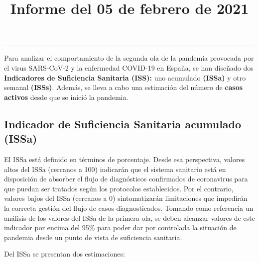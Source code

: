 \documentclass[
  11pt,
]{article}
\title{Informe del 05 de febrero de 2021}
\author{}
\date{\vspace{-2.5em}}
\begin{document}
\maketitle

\renewcommand{\figurename}{Figura}
\renewcommand{\tablename}{Tabla}

\tableofcontents

\vspace{.5cm}

\begin{center}\rule{0.5\linewidth}{0.5pt}\end{center}

\vspace{.5cm}

Para analizar el comportamiento de la segunda ola de la pandemia
provocada por el virus SARS-CoV-2 y la enfermedad COVID-19 en España, se
han diseñado dos \textbf{Indicadores de Suficiencia Sanitaria (ISS):}
uno acumulado \textbf{(ISSa)} y otro semanal \textbf{(ISSs)}. Además, se
lleva a cabo una estimación del número de \textbf{casos activos} desde
que se inició la pandemia.

\hypertarget{indicador-de-suficiencia-sanitaria-acumulado-issa}{%
\subsection{Indicador de Suficiencia Sanitaria acumulado
(ISSa)}\label{indicador-de-suficiencia-sanitaria-acumulado-issa}}

El ISSa está definido en términos de porcentaje. Desde esa perspectiva,
valores altos del ISSa (cercanos a 100) indicarán que el sistema
sanitario está en disposición de absorber el flujo de diagnósticos
confirmados de coronavirus para que puedan ser tratados según los
protocolos establecidos. Por el contrario, valores bajos del ISSa
(cercanos a 0) sintomatizarán limitaciones que impedirán la correcta
gestión del flujo de casos diagnosticados. Tomando como referencia un
análisis de los valores del ISSa de la primera ola, se deben alcanzar
valores de este indicador por encima del 95\% para poder dar por
controlada la situación de pandemia desde un punto de vista de
suficiencia sanitaria.

Del ISSa se presentan dos estimaciones:
\end{document}
